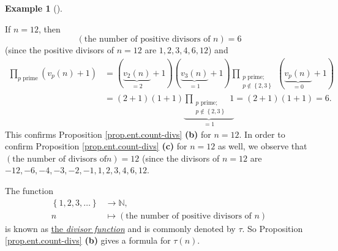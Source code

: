 \documentclass[numbers=enddot,12pt,final,onecolumn,notitlepage]{scrartcl}%
\numberwithin{exer}{subsection}
\theoremstyle{definition}
\newtheorem{exam}[theo]{Example}
\newenvironment{example}[1][]
{\begin{exam}[#1]\begin{leftbar}}
{\end{leftbar}\end{exam}}
\let\prodnonlimits\prod
\renewcommand{\prod}{\prodnonlimits\limits}
\begin{document}
\begin{example}
If $n=12$, then
\[
\left(  \text{the number of positive divisors of }n\right)  =6
\]
(since the positive divisors of $n=12$ are $1,2,3,4,6,12$) and%
\begin{align*}
\prod_{p\text{ prime}}\left(  v_{p}\left(  n\right)  +1\right)   &  =\left(
\underbrace{v_{2}\left(  n\right)  }_{=2}+1\right)  \left(  \underbrace{v_{3}%
\left(  n\right)  }_{=1}+1\right)  \prod_{\substack{p\text{ prime;}%
\\p\notin\left\{  2,3\right\}  }}\left(  \underbrace{v_{p}\left(  n\right)
}_{=0}+1\right) \\
&  =\left(  2+1\right)  \left(  1+1\right)  \underbrace{\prod
_{\substack{p\text{ prime;}\\p\notin\left\{  2,3\right\}  }}1}_{=1}=\left(
2+1\right)  \left(  1+1\right)  =6.
\end{align*}
This confirms Proposition \ref{prop.ent.count-divs} \textbf{(b)} for $n=12$.
In order to confirm Proposition \ref{prop.ent.count-divs} \textbf{(c)} for
$n=12$ as well, we observe that $\left(  \text{the number of divisors of
}n\right)  =12$ (since the divisors of $n=12$ are
$-12,-6,-4,-3,-2,-1,1,2,3,4,6,12$.
\end{example}

The function
\begin{align*}
\left\{  1,2,3,\ldots\right\}   &  \rightarrow\mathbb{N},\\
n  &  \mapsto\left(  \text{the number of positive divisors of }n\right)
\end{align*}
is known as \href{https://en.wikipedia.org/wiki/Divisor_function}{the
\textit{divisor function}} and is commonly denoted by $\tau$. So Proposition
\ref{prop.ent.count-divs} \textbf{(b)} gives a formula for $\tau\left(
n\right)  $.
\end{document}
